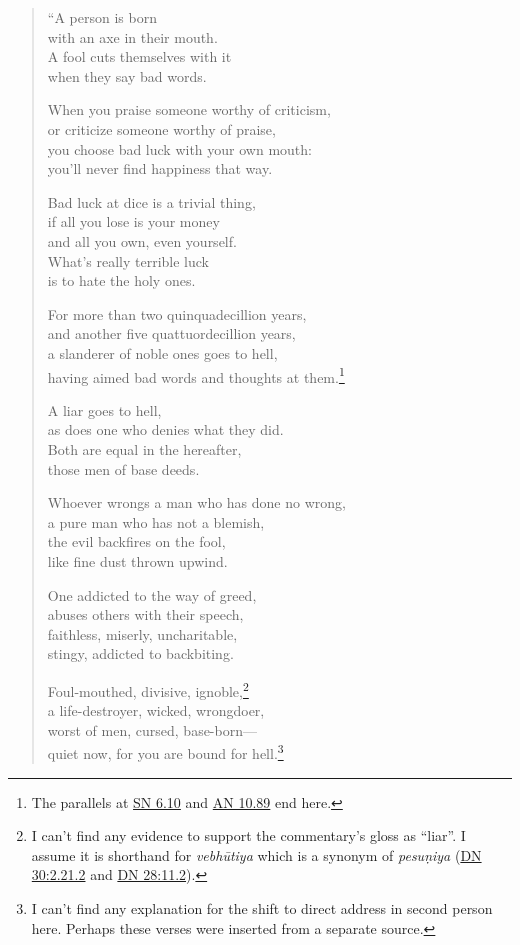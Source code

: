 \documentclass[12pt,openany]{book}%
\begin{document}
\begin{verse}%
“A person is born \\
with an axe in their mouth. \\
A fool cuts themselves with it \\
when they say bad words. 

When you praise someone worthy of criticism, \\
or criticize someone worthy of praise, \\
you choose bad luck with your own mouth: \\
you’ll never find happiness that way. 

Bad luck at dice is a trivial thing, \\
if all you lose is your money \\
and all you own, even yourself. \\
What’s really terrible luck \\
is to hate the holy ones. 

For more than two quinquadecillion years, \\
and another five quattuordecillion years, \\
a slanderer of noble ones goes to hell, \\
having aimed bad words and thoughts at them.\footnote{The parallels at \href{https://suttacentral.net/sn6.10/en/sujato}{SN 6.10} and \href{https://suttacentral.net/an10.89/en/sujato}{AN 10.89} end here. } 

A liar goes to hell, \\
as does one who denies what they did. \\
Both are equal in the hereafter, \\
those men of base deeds. 

Whoever wrongs a man who has done no wrong, \\
a pure man who has not a blemish, \\
the evil backfires on the fool, \\
like fine dust thrown upwind. 

One addicted to the way of greed, \\
abuses others with their speech, \\
faithless, miserly, uncharitable, \\
stingy, addicted to backbiting. 

Foul-mouthed, divisive, ignoble,\footnote{I can’t find any evidence to support the commentary’s gloss as “liar”. I assume it is shorthand for \textit{\textsanskrit{vebhūtiya}} which is a synonym of \textit{\textsanskrit{pesuṇiya}} (\href{https://suttacentral.net/dn30/en/sujato\#2.21.2}{DN 30:2.21.2} and \href{https://suttacentral.net/dn28/en/sujato\#11.2}{DN 28:11.2}). } \\
a life-destroyer, wicked, wrongdoer, \\
worst of men, cursed, base-born—\\
quiet now, for you are bound for hell.\footnote{I can’t find any explanation for the shift to direct address in second person here. Perhaps these verses were inserted from a separate source. } 


\end{verse}
\end{document}
